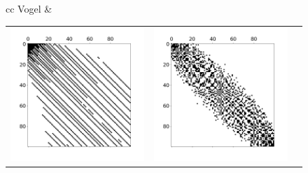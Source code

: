\documentclass[12pt]{article}
\begin{document}
\begin{figure}[h]
\begin{tabular}{cc}
		Vogel & \begin{tabular}{ccc}
			\includegraphics[width=\figordersize\textwidth]{spy_vogel_unordered.png} &
			\includegraphics[width=\figordersize\textwidth]{spy_vogel_xorder.png} &

\end{tabular}
\end{tabular}
\end{figure}
\end{document}
